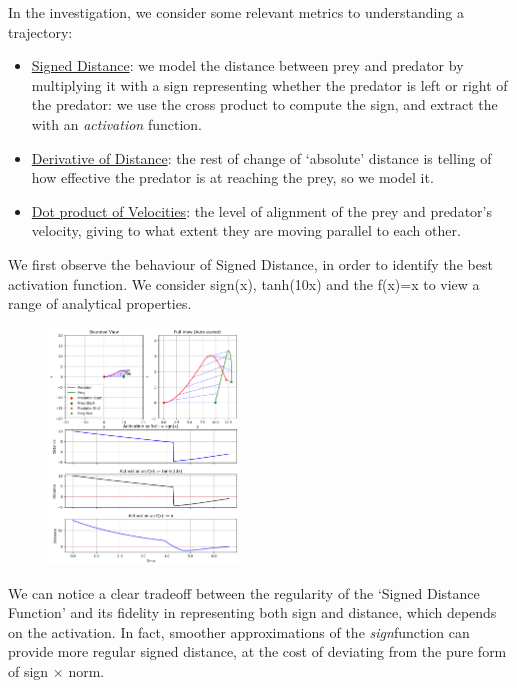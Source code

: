 \documentclass[10pt, twocolumn]{article}
\begin{document}
        In the investigation, we consider some relevant metrics to understanding a trajectory:
        \begin{itemize}
          \item \underline{Signed Distance}: we model the distance between prey and predator by multiplying it with a sign representing whether the predator is left or right of the predator: we use the cross product to compute the sign, and extract the with an \textit{activation} function.
          \item \underline{Derivative of Distance}: the rest of change of `absolute' distance is telling of how effective the predator is at reaching the prey, so we model it.
          \item \underline{Dot product of Velocities}: the level of alignment of the prey and predator's velocity, giving to what extent they are moving parallel to each other.
        \end{itemize}

        We first observe the behaviour of Signed Distance, in order to identify the best activation function. We consider sign(x), tanh(10x) and the f(x)=x to view a range of analytical properties.
        \begin{figure}[H]
          \centering
          \includegraphics[width=0.45\textwidth]{figures/signed_distance.png}
          \label{fig:trajectory}
        \end{figure}

        We can notice a clear tradeoff between the regularity of the `Signed Distance Function' and its fidelity in representing both sign and distance, which depends on the activation. In fact, smoother approximations of the \textit{sign}function can provide more regular signed distance, at the cost of deviating from the pure form of sign $\times$ norm.
\end{document}
